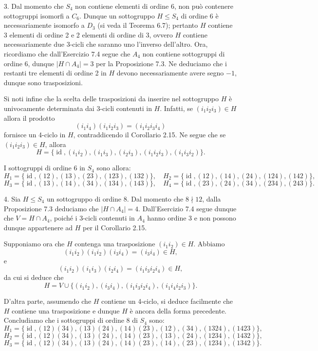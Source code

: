 \documentclass[12px]{article}
\begin{document}
{\begin{enumerate}
    \item[3.] Dal momento che $S_4$ non contiene elementi di ordine 6, non può contenere sottogruppi isomorfi a $C_6$. Dunque un sottogruppo $H \leq S_4$ di ordine 6 è necessariamente isomorfo a $D_3$ (si veda il Teorema 6.7); pertanto $H$ contiene 3 elementi di ordine 2 e 2 elementi di ordine di 3, ovvero $H$ contiene necessariamente due $3$-cicli che saranno uno l’inverso dell’altro.
Ora, ricordiamo che dall’Esercizio 7.4 segue che $A_4$ non contiene sottogruppi di ordine 6, dunque 
$\lvert H \cap A_4 \rvert = 3$ per la Proposizione 7.3. Ne deduciamo che i restanti tre elementi di ordine 2 in $H$ devono necessariamente avere segno $-1$, dunque sono trasposizioni.

Si noti infine che la scelta delle trasposizioni da inserire nel sottogruppo $H$ è univocamente determinata dai 3-cicli contenuti in $H$. Infatti, se $(i_1 i_2 i_3) \in H$ allora il prodotto 
\[
	(i_1i_4)(i_1 i_2 i_3) = (i_1 i_2 i_3 i_4)
\]
fornisce un 4-ciclo in $H$, contraddicendo il Corollario 2.15. Ne segue che se $(i_1 i_2 i_3) \in H$, allora
\[
H = \{\operatorname{id}, (i_1 i_2), (i_1 i_3), (i_2 i_3), (i_1 i_2 i_3), (i_1 i_3 i_2)\}.
\]

I sottogruppi di ordine 6 in $S_4$ sono allora:
\[
H_1 = \{\operatorname{id}, (12), (13), (23), (123), (132)\}, \quad
H_2 = \{\operatorname{id}, (12), (14), (24), (124), (142)\},
\]
\[
H_3 = \{\operatorname{id}, (13), (14), (34), (134), (143)\}, \quad
H_4 = \{\operatorname{id}, (23), (24), (34), (234), (243)\}.
\]

    \item[4.] Sia $H \leq S_4$ un sottogruppo di ordine 8. Dal momento che $8 \nmid 12$, dalla Proposizione 7.3 deduciamo che $\lvert H \cap A_4 \rvert = 4$. Dall’Esercizio 7.4 segue dunque che $V = H \cap A_4$, poiché i 3-cicli contenuti in $A_4$ hanno ordine 3 e non possono dunque appartenere ad $H$ per il Corollario 2.15.

    Supponiamo ora che $H$ contenga una trasposizione $(i_1 i_2) \in H$. Abbiamo
    \[
    (i_1 i_2)(i_1 i_2)(i_3 i_4) = (i_3 i_4) \in H,
    \]
    e
    \[
    (i_1 i_2)(i_1 i_3)(i_2 i_4) = (i_1i_3i_2i_4) \in H,
    \]
    da cui si deduce che 
    \[
    H = V \cup \{(i_1 i_2), (i_3 i_4), (i_1 i_3 i_2 i_4), (i_1 i_4 i_2 i_3)\}.
    \]

    D’altra parte, assumendo che $H$ contiene un 4-ciclo, si deduce facilmente che $H$ contiene una trasposizione e dunque $H$ è ancora della forma precedente. Concludiamo che i sottogruppi di ordine 8 di $S_4$ sono:
    \[
    H_1 = \{\operatorname{id}, (12)(34), (13)(24), (14)(23), (12), (34), (1324), (1423)\},
    \]
    \[
    H_2 = \{\operatorname{id}, (12)(34), (13)(24), (14)(23), (13), (24), (1234), (1432)\},
    \]
    \[
    H_3 = \{\operatorname{id}, (12)(34), (13)(24), (14)(23), (14), (23), (1234), (1342)\}.
    \]


\end{enumerate}}
\end{document}
